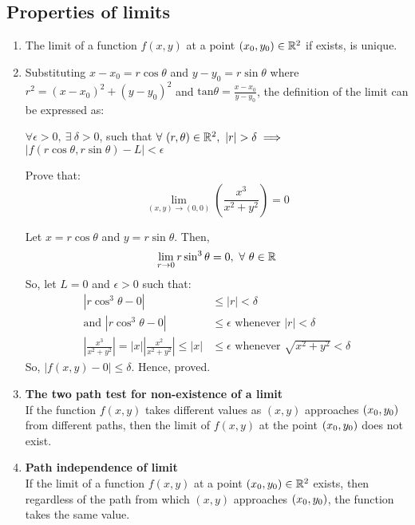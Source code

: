 \subsection{Properties of limits}
\begin{enumerate}
    \item The limit of a function $f(x, y)$ at a point $(x_0, y_0) \in \mathbb{R}^2$ if exists, is unique.

    \item Substituting $x - x_0 = r\cos{\theta}$ and $y - y_0 = r\sin{\theta}$ where $r^2 = (x - x_0)^2 + (y - y_0)^2$
    and $\text{tan}\theta = \frac{x - x_0}{y - y_0}$, the definition of the limit can be expressed as:

    $\forall \epsilon > 0,\ \exists\ \delta > 0$, such that $\forall\ (r, \theta) \in \mathbb{R}^2,\ |r| > \delta \implies$
    $|f(r\cos{\theta}, r\sin{\theta}) - L| < \epsilon$

    \begin{example}
        \normalfont Prove that: $$\lim_{(x, y) \to (0, 0)} \left( \frac{x^3}{x^2 + y^2} \right) = 0$$

        Let $x = r\cos{\theta}$ and $y = r\sin{\theta}$. Then,
        $$\lim_{r \to 0} r\sin^3{\theta} = 0,\ \forall \ \theta \in \R$$
        So, let $L = 0$ and $\epsilon > 0$ such that:
        \begin{align*}
            |r\cos^3{\theta} - 0| &\leq |r| < \delta \\
            \text{and }|r\cos^3{\theta} - 0| &\leq \epsilon \text{ whenever } |r| < \delta \\
            \left| \frac{x^3}{x^2 + y^2} \right| = |x| \left| \frac{x^2}{x^2 + y^2} \right| \leq |x| &\leq \epsilon \text{ whenever }
            \sqrt{x^2 + y^2} < \delta
        \end{align*}
        So, $|f(x, y) - 0| \leq \delta$. Hence, proved.
    \end{example}

    \item \textbf{The two path test for non-existence of a limit} \\
    If the function $f(x, y)$ takes different values as $(x, y)$ approaches $(x_0, y_0)$ from different paths, then the limit
    of $f(x, y)$ at the point $(x_0, y_0)$ does not exist.

    \item \textbf{Path independence of limit} \\
    If the limit of a function $f(x, y)$ at a point $(x_0, y_0) \in \mathbb{R}^2$ exists, then regardless of the path from which $(x, y)$
    approaches $(x_0, y_0)$, the function takes the same value.


\end{enumerate}
